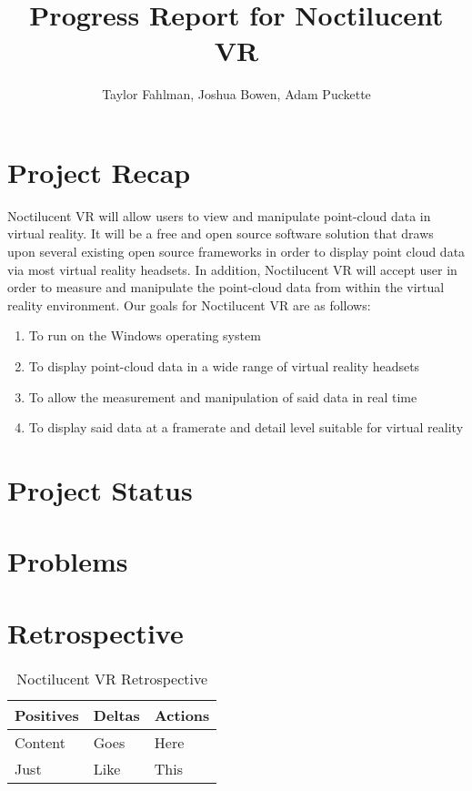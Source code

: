 \documentclass{article}
\begin{document}
\title {Progress Report for Noctilucent VR}
\author {Taylor Fahlman, Joshua Bowen, Adam Puckette}

\maketitle

\section{Project Recap}

Noctilucent VR will allow users to view and manipulate point-cloud data in virtual reality. 
It will be a free and open source software solution that draws upon several existing open source frameworks in order to display point cloud data via most virtual reality headsets. 
In addition, Noctilucent VR will accept user in order to measure and manipulate the point-cloud data from within the virtual reality environment. 
Our goals for Noctilucent VR are as follows:

\begin{enumerate}
\item To run on the Windows operating system
\item To display point-cloud data in a wide range of virtual reality headsets
\item To allow the measurement and manipulation of said data in real time
\item To display said data at a framerate and detail level suitable for virtual reality
\end{enumerate}

\section{Project Status}

\section{Problems}

\section{Retrospective}

\begin{table}[ht]
\caption{Noctilucent VR Retrospective}
\centering
\begin{tabular}{l l l}
\hline\hline
Positives & Deltas & Actions \\ [0.5ex]
\hline
Content & Goes & Here \\
Just & Like & This \\ [1ex]
\hline
\end{tabular}
\end{table}
\end{document}
